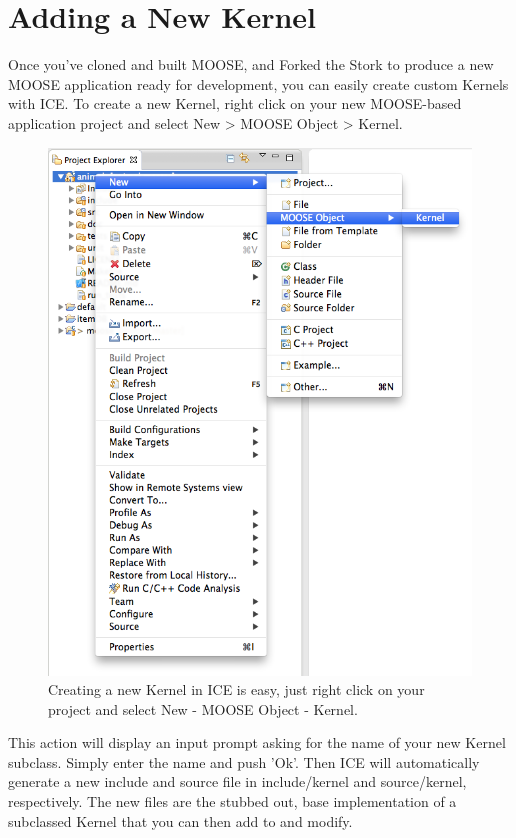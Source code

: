 \newpage

\section{Adding a New Kernel}\label{adding-a-new-kernel}

Once you've cloned and built MOOSE, and Forked the Stork to produce a
new MOOSE application ready for development, you can easily create
custom Kernels with ICE. To create a new Kernel, right click on your new
MOOSE-based application project and select New \textgreater{} MOOSE
Object \textgreater{} Kernel.

\begin{figure}[htbp]
\centering
\includegraphics[width=\textwidth]{figures/new_kernel.png}
\caption{Creating a new Kernel in ICE is easy, just right click on your project and select New - MOOSE Object - Kernel.}
\end{figure}

This action will display an input prompt asking for the name of your new
Kernel subclass. Simply enter the name and push 'Ok'. Then ICE will
automatically generate a new include and source file in include/kernel
and source/kernel, respectively. The new files are the stubbed out, base
implementation of a subclassed Kernel that you can then add to and
modify.

